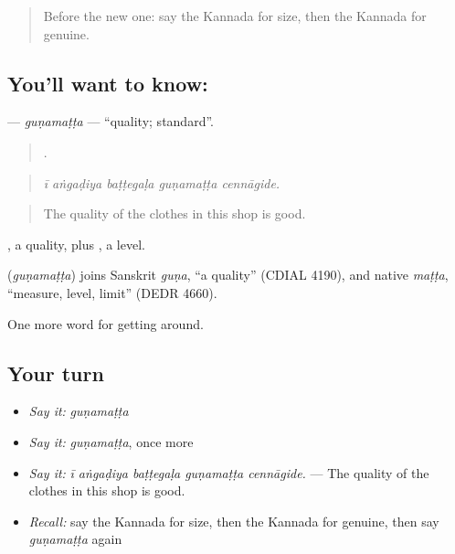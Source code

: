 \label{lesson:KA-C468-gunamatta}



\begin{quote}
Before the new one: say the Kannada for size, then the Kannada for genuine.
\end{quote}

\subsection*{You'll want to know: }
\textbf{} — \emph{guṇamaṭṭa} — \textquotedblleft{}quality; standard\textquotedblright{}.

\begin{quote}
    .
\end{quote}

\begin{quote}
\emph{ī aṅgaḍiya baṭṭegaḷa guṇamaṭṭa cennāgide.}
\end{quote}

\begin{quote}
The quality of the clothes in this shop is good.
\end{quote}

, a quality, plus , a level.

\begin{cousinweb}
\textbf{} (\emph{guṇamaṭṭa}) joins Sanskrit \emph{guṇa}, \textquotedblleft{}a quality\textquotedblright{} (CDIAL 4190), and native \emph{maṭṭa}, \textquotedblleft{}measure, level, limit\textquotedblright{} (DEDR 4660).
\end{cousinweb}

\begin{grammarlens}[title={What you've built}]
One more word for getting around.
\end{grammarlens}

\subsection*{Your turn}
\begin{itemize}
\raggedright
  \item \emph{Say it:} \emph{guṇamaṭṭa}
  \item \emph{Say it:} \emph{guṇamaṭṭa}, once more
  \item \emph{Say it:} \emph{ī aṅgaḍiya baṭṭegaḷa guṇamaṭṭa cennāgide.} — The quality of the clothes in this shop is good.
  \item \emph{Recall:} say the Kannada for size, then the Kannada for genuine, then say \emph{guṇamaṭṭa} again
\end{itemize}

